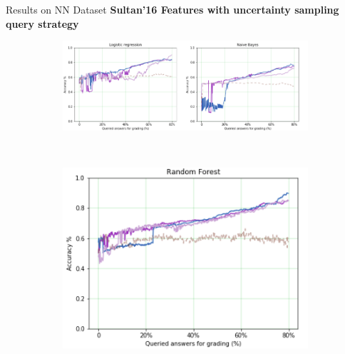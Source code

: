 \documentclass{beamer}
\begin{document}
\begin{frame}{Results on NN Dataset}
	\textbf{Sultan'16 Features with uncertainty sampling query strategy}
		\begin{figure}[!htb]
			\begin{subfigure}[b]{0.62\textwidth}
				\includegraphics[width=\textwidth]{images/t1}
				\label{mohlergrades}
			\end{subfigure}
			~
			\begin{subfigure}[b]{0.3\textwidth}
				\includegraphics[width=\textwidth]{images/t2}
				\label{mohlerdisagreement}
			\end{subfigure}
			

\end{figure}
\end{frame}
\end{document}
